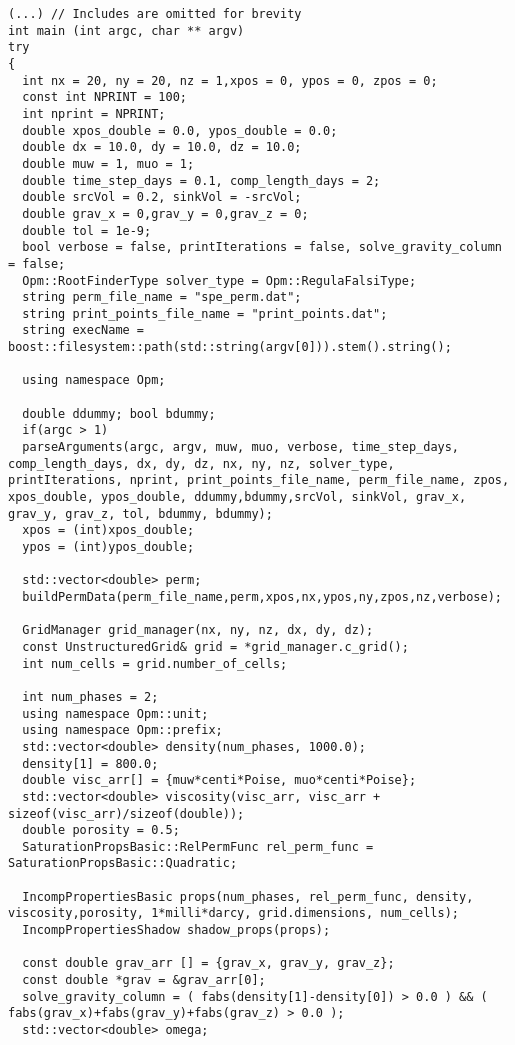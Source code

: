 \begin{lstlisting}[caption={The C++ program used to run the 3D numerical tests in Chapter \ref{chapter:numerical_results}},label={listing:test_driver_3D}]
(...) // Includes are omitted for brevity
int main (int argc, char ** argv)
try
{
  int nx = 20, ny = 20, nz = 1,xpos = 0, ypos = 0, zpos = 0;
  const int NPRINT = 100;
  int nprint = NPRINT;
  double xpos_double = 0.0, ypos_double = 0.0;
  double dx = 10.0, dy = 10.0, dz = 10.0;
  double muw = 1, muo = 1;
  double time_step_days = 0.1, comp_length_days = 2;
  double srcVol = 0.2, sinkVol = -srcVol;
  double grav_x = 0,grav_y = 0,grav_z = 0;
  double tol = 1e-9;
  bool verbose = false, printIterations = false, solve_gravity_column = false;
  Opm::RootFinderType solver_type = Opm::RegulaFalsiType;
  string perm_file_name = "spe_perm.dat";
  string print_points_file_name = "print_points.dat";
  string execName = boost::filesystem::path(std::string(argv[0])).stem().string();
  
  using namespace Opm;
  
  double ddummy; bool bdummy;
  if(argc > 1)
  parseArguments(argc, argv, muw, muo, verbose, time_step_days, comp_length_days, dx, dy, dz, nx, ny, nz, solver_type, printIterations, nprint, print_points_file_name, perm_file_name, zpos, xpos_double, ypos_double, ddummy,bdummy,srcVol, sinkVol, grav_x, grav_y, grav_z, tol, bdummy, bdummy);
  xpos = (int)xpos_double;
  ypos = (int)ypos_double;
  
  std::vector<double> perm;
  buildPermData(perm_file_name,perm,xpos,nx,ypos,ny,zpos,nz,verbose);
  
  GridManager grid_manager(nx, ny, nz, dx, dy, dz);
  const UnstructuredGrid& grid = *grid_manager.c_grid();
  int num_cells = grid.number_of_cells;

  int num_phases = 2;
  using namespace Opm::unit;
  using namespace Opm::prefix;
  std::vector<double> density(num_phases, 1000.0);
  density[1] = 800.0;
  double visc_arr[] = {muw*centi*Poise, muo*centi*Poise};
  std::vector<double> viscosity(visc_arr, visc_arr + sizeof(visc_arr)/sizeof(double));
  double porosity = 0.5;
  SaturationPropsBasic::RelPermFunc rel_perm_func = SaturationPropsBasic::Quadratic;
  
  IncompPropertiesBasic props(num_phases, rel_perm_func, density, viscosity,porosity, 1*milli*darcy, grid.dimensions, num_cells);
  IncompPropertiesShadow shadow_props(props);
  
  const double grav_arr [] = {grav_x, grav_y, grav_z};
  const double *grav = &grav_arr[0];
  solve_gravity_column = ( fabs(density[1]-density[0]) > 0.0 ) && ( fabs(grav_x)+fabs(grav_y)+fabs(grav_z) > 0.0 );
  std::vector<double> omega;


\end{lstlisting}

